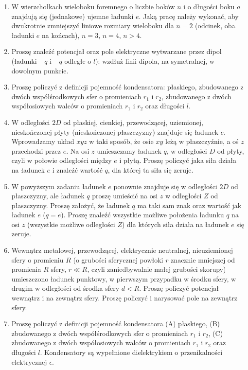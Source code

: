 \documentclass[a4paper,11pt]{article}
\begin{document}
\begin{enumerate}

\item W wierzchołkach wieloboku foremnego o liczbie boków $n$ i o
  długości boku $a$ znajdują się (jednakowe) ujemne ładunki $e$. Jaką
  pracę należy wykonać, aby dwukrotnie zmniejszyć liniowe rozmiary
  wieloboku dla $n = 2$ (odcinek, oba ładunki $e$ na końcach),
  $n = 3$, $n = 4$, $n > 4$.

\item Proszę znaleźć potencjał oraz pole elektryczne wytwarzane przez
  dipol (ładunki $-q$ i $-q$ odległe o $l$): wzdłuż linii dipola, na
  symetralnej, w dowolnym punkcie.

\item Proszę policzyć z definicji pojemność kondensatora: płaskiego,
  zbudowanego z dwóch współśrodkowych sfer o promieniach $r_{ 1 }$ i
  $r_{ 2 }$, zbudowanego z dwóch współosiowych walców o promieniach
  $r_{ 1 }$ i $r_{ 2 }$ oraz długości $l$.

\item W odległości $2D$ od płaskiej, cienkiej, przewodzącej,
  uziemionej, nieskończonej płyty (nieskończonej płaszczyzny) znajduje
  się ładunek $e$. Wprowadzamy układ $xyz$ w taki sposób, że osie $xy$
  leżą w płaszczyźnie, a oś $z$ przechodzi przez $e$. Na osi $z$
  umieszczamy ładunek $q$, w odległości $D$ od płyty, czyli w połowie
  odległości między $e$ i płytą. Proszę policzyć jaka siła działa na
  ładunek $e$ i znaleźć wartość $q$, dla której ta siła się zeruje.

\item W powyższym zadaniu ładunek $e$ ponownie znajduje się w
  odległości $2D$ od płaszczyzny, ale ładunek $q$ proszę umieścić na
  osi $z$ w odległości $Z$ od płaszczyzny. Proszę założyć, że ładunek
  $q$ ma taki sam znak oraz wartość jak ładunek $e$ ($q = e$). Proszę
  znaleźć wszystkie możliwe położenia ładunku $q$ na osi $z$
  (wszystkie możliwe odległości $Z$) dla których siła działa na
  ładunek $e$ się zeruje.

\item Wewnątrz metalowej, przewodzącej, elektrycznie neutralnej,
  nieuziemionej sfery o promieniu $R$ (o grubości sferycznej powłoki
  $r$ znacznie mniejszej od promienia $R$ sfery, $r \ll R$, czyli
  zaniedbywalnie małej grubości skorupy) umieszczono ładunek punktowy,
  w pierwszym przypadku w środku sfery, w drugim w odległości od
  środka sfery $d < R$. Proszę policzyć potencjał wewnątrz i na
  zewnątrz sfery. Proszę policzyć i narysować pole na zewnątrz sfery.

\item Proszę policzyć z definicji pojemność kondensatora (A)
  płaskiego, (B) zbudowanego z dwóch współśrodkowych sfer o
  promieniach $r_{ 1 }$ i $r_{ 2 }$, (C) zbudowanego z dwóch
  współosiowych walców o promieniach $r_{ 1 }$ i $r_{ 2 }$ oraz
  długości $l$. Kondensatory są wypełnione dielektrykiem o
  przenikalności elektrycznej $\epsilon$.

\end{enumerate}
\end{document}
